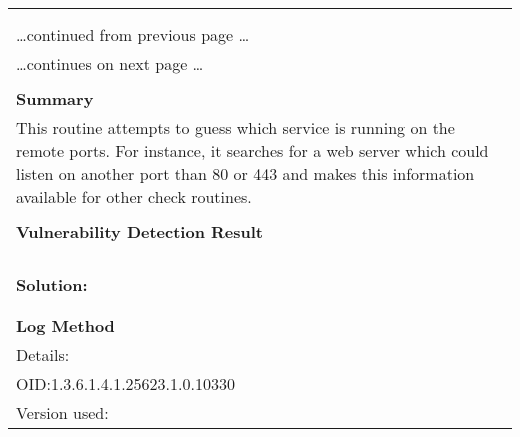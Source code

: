 \documentclass{article}
\begin{document}
\begin{longtable}{|p{}|}
\hline
\rowcolor{gvm_log}{\color{white}{Log (CVSS: 0.0) }}\\
\rowcolor{gvm_log}{\color{white}{NVT: Services}}\\
\hline
\endfirsthead
\hfill\ldots continued from previous page \ldots \\
\hline
\endhead
\hline
\ldots continues on next page \ldots \\
\endfoot
\hline
\endlastfoot
\\
\textbf{Summary}\\
This routine attempts to guess which service is running on the
  remote ports. For instance, it searches for a web server which could listen on another port than
  80 or 443 and makes this information available for other check routines.\\

        \hline
        \\
\textbf{Vulnerability Detection Result}\\
\rowcolor{white}{\verb=An SMTP server is running on this port=}\\
\rowcolor{white}{\verb=Here is its banner : =}\\
\rowcolor{white}{\verb=220 localhost.fritz.box ESMTP Postfix (Debian/GNU)=}\\

          \hline
          \\
\textbf{Solution:}\\
\\


        \hline
        \\
\textbf{Log Method}\\
Details:
\rowcolor{white}{\verb=Services=}\\
OID:1.3.6.1.4.1.25623.1.0.10330\\
Version used:
\rowcolor{white}{\verb=2021-03-15T10:42:03Z=}\\
\end{longtable}
\end{document}
